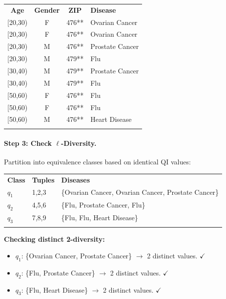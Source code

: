 \begin{center}
\begin{tabular}{cccp{3cm}}
\hline\noalign{\smallskip}
\textbf{Age} & \textbf{Gender} & \textbf{ZIP} & \textbf{Disease}\\
\noalign{\smallskip}\svhline\noalign{\smallskip}
{[}20,30) & F & 476** & Ovarian Cancer\\
{[}20,30) & F & 476** & Ovarian Cancer\\
{[}20,30) & M & 476** & Prostate Cancer\\
{[}20,30) & M & 479** & Flu\\
{[}30,40) & M & 479** & Prostate Cancer\\
{[}30,40) & M & 479** & Flu\\
{[}50,60) & F & 476** & Flu\\
{[}50,60) & F & 476** & Flu\\
{[}50,60) & M & 476** & Heart Disease\\
\noalign{\smallskip}\hline\noalign{\smallskip}
\end{tabular}
\end{center}

\paragraph{Step 3: Check $\ell$-Diversity.}
Partition into equivalence classes based on identical QI values:

\begin{center}
\begin{tabular}{p{1.5cm}p{2cm}p{7cm}}
\hline\noalign{\smallskip}
\textbf{Class} & \textbf{Tuples} & \textbf{Diseases}\\
\noalign{\smallskip}\svhline\noalign{\smallskip}
$q_1$ & 1,2,3 & \{Ovarian Cancer, Ovarian Cancer, Prostate Cancer\}\\
$q_2$ & 4,5,6 & \{Flu, Prostate Cancer, Flu\}\\
$q_3$ & 7,8,9 & \{Flu, Flu, Heart Disease\}\\
\noalign{\smallskip}\hline\noalign{\smallskip}
\end{tabular}
\end{center}

\textbf{Checking distinct 2-diversity:}
\begin{itemize}
  \item $q_1$: \{Ovarian Cancer, Prostate Cancer\} $\to$ 2 distinct values. $\checkmark$
  \item $q_2$: \{Flu, Prostate Cancer\} $\to$ 2 distinct values. $\checkmark$
  \item $q_3$: \{Flu, Heart Disease\} $\to$ 2 distinct values. $\checkmark$
\end{itemize}

